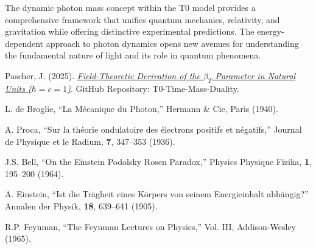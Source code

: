 \documentclass[12pt,a4paper]{article}
\begin{document}
	The dynamic photon mass concept within the T0 model provides a comprehensive framework that unifies quantum mechanics, relativity, and gravitation while offering distinctive experimental predictions. The energy-dependent approach to photon dynamics opens new avenues for understanding the fundamental nature of light and its role in quantum phenomena.
	
	\begin{thebibliography}{99}
		
		Pascher, J. (2025). \href{https://github.com/jpascher/T0-Time-Mass-Duality/blob/main/2/pdf/DerivationVonBetaEn.pdf}{\textit{Field-Theoretic Derivation of the $\beta_T$ Parameter in Natural Units ($\hbar = c = 1$)}}. GitHub Repository: T0-Time-Mass-Duality.
		
		L. de Broglie, ``La M\'{e}canique du Photon,'' Hermann \& Cie, Paris (1940).
		
		A. Proca, ``Sur la th\'{e}orie ondulatoire des \'{e}lectrons positifs et n\'{e}gatifs,'' Journal de Physique et le Radium, \textbf{7}, 347--353 (1936).
		
		J.S. Bell, ``On the Einstein Podolsky Rosen Paradox,'' Physics Physique Fizika, \textbf{1}, 195--200 (1964).
		
		A. Einstein, ``Ist die Tr\"{a}gheit eines K\"{o}rpers von seinem Energieinhalt abh\"{a}ngig?'' Annalen der Physik, \textbf{18}, 639--641 (1905).
		
		R.P. Feynman, ``The Feynman Lectures on Physics,'' Vol. III, Addison-Wesley (1965).
		
	\end{thebibliography}
	
\end{document}
